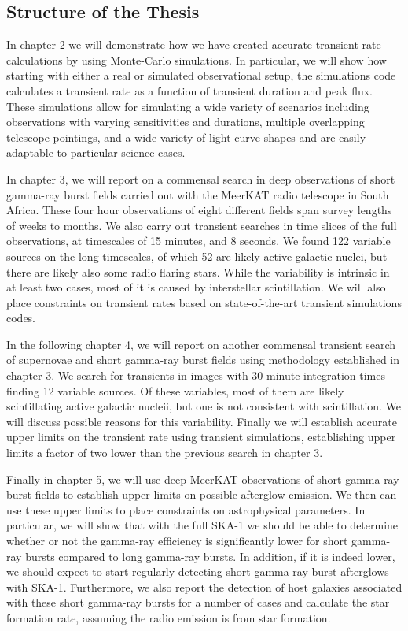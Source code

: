 \documentclass[12pt]{article}
\begin{document}
\subsection{Structure of the Thesis}
In chapter 2 we will demonstrate how we have created accurate transient rate calculations by using Monte-Carlo simulations. In particular, we will show how starting with either a real or simulated observational setup, the simulations code calculates a transient rate as a function of transient duration and peak flux. These simulations allow for simulating a wide variety of scenarios including observations with varying sensitivities and durations, multiple overlapping telescope pointings, and a wide variety of light curve shapes and are easily adaptable to particular science cases.

In chapter 3, we will report on a commensal search in deep observations of short gamma-ray burst fields carried out with the MeerKAT radio telescope in South Africa. These four hour observations of eight different fields span survey lengths of weeks to months. We also carry out transient searches in time slices of the full observations, at timescales of 15 minutes, and 8 seconds. We found 122 variable sources on the long timescales, of which 52 are likely active galactic nuclei, but there are likely also some radio flaring stars. While the variability is intrinsic in at least two cases, most of it is caused by interstellar scintillation. We will also place constraints on transient rates based on state-of-the-art transient simulations codes.

In the following chapter 4, we will report on another commensal transient search of supernovae and short gamma-ray burst fields using methodology established in chapter 3. We search for transients in images with 30 minute integration times finding 12 variable sources. Of these variables, most of them are likely scintillating active galactic nucleii, but one is not consistent with scintillation. We will discuss possible reasons for this variability. Finally we will establish accurate upper limits on the transient rate using transient simulations, establishing upper limits a factor of two lower than the previous search in chapter 3. 

Finally in chapter 5, we will use deep MeerKAT observations of short gamma-ray burst fields to establish upper limits on possible afterglow emission. We then can use these upper limits to place constraints on astrophysical parameters. In particular, we will show that with the full SKA-1 we should be able to determine whether or not the gamma-ray efficiency is significantly lower for short gamma-ray bursts compared to long gamma-ray bursts. In addition, if it is indeed lower, we should expect to start regularly detecting short gamma-ray burst afterglows with SKA-1. Furthermore, we also report the detection of host galaxies associated with these short gamma-ray bursts for a number of cases and calculate the star formation rate, assuming the radio emission is from star formation.
\end{document}
